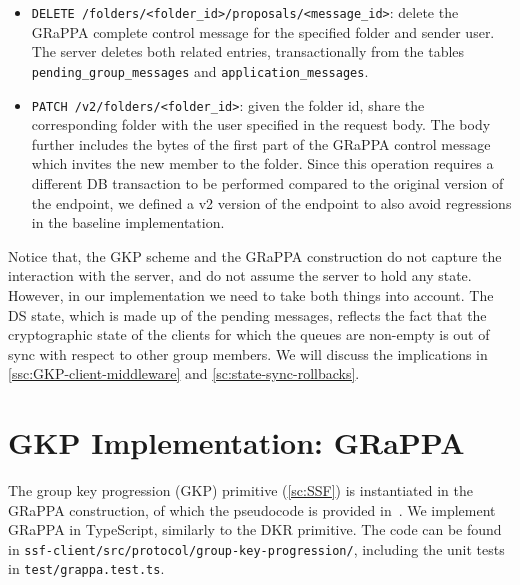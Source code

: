 \begin{itemize}
    \item \texttt{DELETE /folders/<folder\_id>/proposals/<message\_id>}: delete the GRaPPA complete control message for the specified folder and sender user. The server deletes both related entries, transactionally from the tables \texttt{pending\_group\_messages} and \texttt{application\_messages}.
    \item \texttt{PATCH /v2/folders/<folder\_id>}: given the folder id, share the corresponding folder with the user specified in the request body. The body further includes the bytes of the first part of the GRaPPA control message which invites the new member to the folder. Since this operation requires a different DB transaction to be performed compared to the original version of the endpoint, we defined a v2 version of the endpoint to also avoid regressions in the baseline implementation.
\end{itemize}

Notice that, the GKP scheme and the GRaPPA construction do not capture the
interaction with the server, and do not assume the server
to hold any state. However, in our implementation we
need to take both things into account. 
The DS state, which is made up of the pending messages, reflects the fact that
the cryptographic state of the clients for which the queues are non-empty
is out of sync with respect to other group members.
We will discuss the implications in \cref{ssc:GKP-client-middleware} and \cref{sc:state-sync-rollbacks}.

\section{GKP Implementation: GRaPPA}\label{sc:GRaPPA-implementation}

The group key progression (GKP) primitive (\cref{sc:SSF}) is instantiated in the
GRaPPA construction, of which the pseudocode is provided in~\cite{GKP}.
We implement GRaPPA in TypeScript, similarly to the DKR primitive.
The code can be found in \texttt{ssf-client/src/protocol/group-key-progression/},
including the unit tests in \texttt{test/grappa.test.ts}.

